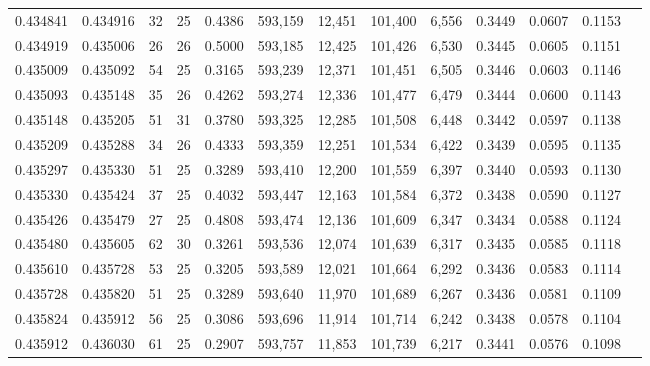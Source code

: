\begin{tabular}{rrrrrrrrrrrrr}
0.434841 & 0.434916 &    32 &  25 &                                     0.4386 & 593,159 &  12,451 & 101,400 &   6,556 & 0.3449 & 0.0607 & 0.1153 \\
0.434919 & 0.435006 &    26 &  26 &                                     0.5000 & 593,185 &  12,425 & 101,426 &   6,530 & 0.3445 & 0.0605 & 0.1151 \\
0.435009 & 0.435092 &    54 &  25 &                                     0.3165 & 593,239 &  12,371 & 101,451 &   6,505 & 0.3446 & 0.0603 & 0.1146 \\
0.435093 & 0.435148 &    35 &  26 &                                     0.4262 & 593,274 &  12,336 & 101,477 &   6,479 & 0.3444 & 0.0600 & 0.1143 \\
0.435148 & 0.435205 &    51 &  31 &                                     0.3780 & 593,325 &  12,285 & 101,508 &   6,448 & 0.3442 & 0.0597 & 0.1138 \\
0.435209 & 0.435288 &    34 &  26 &                                     0.4333 & 593,359 &  12,251 & 101,534 &   6,422 & 0.3439 & 0.0595 & 0.1135 \\
0.435297 & 0.435330 &    51 &  25 &                                     0.3289 & 593,410 &  12,200 & 101,559 &   6,397 & 0.3440 & 0.0593 & 0.1130 \\
0.435330 & 0.435424 &    37 &  25 &                                     0.4032 & 593,447 &  12,163 & 101,584 &   6,372 & 0.3438 & 0.0590 & 0.1127 \\
0.435426 & 0.435479 &    27 &  25 &                                     0.4808 & 593,474 &  12,136 & 101,609 &   6,347 & 0.3434 & 0.0588 & 0.1124 \\
0.435480 & 0.435605 &    62 &  30 &                                     0.3261 & 593,536 &  12,074 & 101,639 &   6,317 & 0.3435 & 0.0585 & 0.1118 \\
0.435610 & 0.435728 &    53 &  25 &                                     0.3205 & 593,589 &  12,021 & 101,664 &   6,292 & 0.3436 & 0.0583 & 0.1114 \\
0.435728 & 0.435820 &    51 &  25 &                                     0.3289 & 593,640 &  11,970 & 101,689 &   6,267 & 0.3436 & 0.0581 & 0.1109 \\
0.435824 & 0.435912 &    56 &  25 &                                     0.3086 & 593,696 &  11,914 & 101,714 &   6,242 & 0.3438 & 0.0578 & 0.1104 \\
0.435912 & 0.436030 &    61 &  25 &                                     0.2907 & 593,757 &  11,853 & 101,739 &   6,217 & 0.3441 & 0.0576 & 0.1098 \\

\end{tabular}
